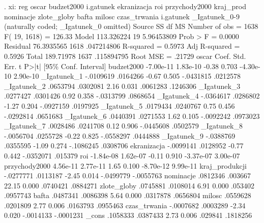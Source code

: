 \begin{stlog}

. xi: reg oscar  budzet2000 i.gatunek ekranizacja roi przychody2000 kraj_prod nominacje zlote_globy bafta
 milosc czas_trwania
i.gatunek         _Igatunek_0-9       (naturally coded; _Igatunek_0 omitted)
{\smallskip}
      Source {\VBAR}       SS       df       MS              Number of obs =    1638
           F( 19,  1618) =  126.33
       Model {\VBAR}  113.326224    19  5.96453809           Prob > F      =  0.0000
    Residual {\VBAR}  76.3935565  1618  .047214806           R-squared     =  0.5973
           Adj R-squared =  0.5926
       Total {\VBAR}   189.71978  1637  .115894795           Root MSE      =  .21729
{\smallskip}
         oscar {\VBAR}      Coef.   Std. Err.      t    P>|t|     [95\% Conf. Interval]
    budzet2000 {\VBAR}  -7.00e-11   1.83e-10    -0.38   0.703    -4.30e-10    2.90e-10
   _Igatunek_1 {\VBAR}  -.0109619   .0164266    -0.67   0.505    -.0431815    .0212578
   _Igatunek_2 {\VBAR}   .0653794   .0302081     2.16   0.031     .0061283    .1246306
   _Igatunek_3 {\VBAR}   .0277427   .0301426     0.92   0.358    -.0313799    .0868654
   _Igatunek_4 {\VBAR}  -.0364617   .0286802    -1.27   0.204    -.0927159    .0197925
   _Igatunek_5 {\VBAR}   .0179434   .0240767     0.75   0.456    -.0292814    .0651683
   _Igatunek_6 {\VBAR}   .0440391   .0271553     1.62   0.105    -.0092242    .0973023
   _Igatunek_7 {\VBAR}   .0028486   .0241708     0.12   0.906    -.0445608    .0502579
   _Igatunek_8 {\VBAR}  -.0056704   .0255728    -0.22   0.825    -.0558297    .0444888
   _Igatunek_9 {\VBAR}  -.0388769   .0355595    -1.09   0.274    -.1086245    .0308706
   ekranizacja {\VBAR}  -.0099141   .0128952    -0.77   0.442    -.0352071     .015379
           roi {\VBAR}  -1.84e-08   1.62e-07    -0.11   0.910    -3.37e-07    3.00e-07
 przychody2000 {\VBAR}   4.56e-11   2.77e-11     1.65   0.100    -8.70e-12    9.99e-11
kraj_produkcji {\VBAR}  -.0277771   .0113187    -2.45   0.014    -.0499779   -.0055763
     nominacje {\VBAR}   .0812346    .003667    22.15   0.000     .0740421    .0884271
   zlote_globy {\VBAR}   .0745881   .0108014     6.91   0.000      .053402    .0957743
         bafta {\VBAR}   .0487341   .0086398     5.64   0.000     .0317878    .0656804
        milosc {\VBAR}   .0559628   .0201809     2.77   0.006     .0163793    .0955463
  czas_trwania {\VBAR}  -.0007682   .0003289    -2.34   0.020    -.0014133   -.0001231
         _cons {\VBAR}   .1058333   .0387433     2.73   0.006      .029841    .1818256

\end{stlog}
